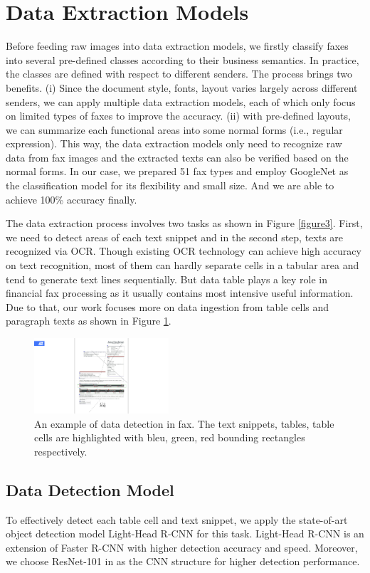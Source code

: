 \documentclass[sigconf]{acmart}
\begin{document}
\section{Data Extraction Models}
Before feeding raw images into data extraction models, we firstly classify faxes into several pre-defined classes according to their business semantics. In practice, the classes are defined with respect to different senders. The process brings two benefits. (i) Since the document style, fonts, layout varies largely across different senders, we can apply multiple data extraction models, each of which only focus on limited types of faxes to improve the accuracy. (ii) with pre-defined layouts, we can summarize each functional areas into some normal forms (i.e., regular expression). This way, the data extraction models only need to recognize raw data from fax images and the extracted texts can also be verified based on the normal forms. In our case, we prepared 51 fax types and employ GoogleNet \cite{szegedy2015going} as the classification model for its flexibility and small size. And we are able to achieve 100\% accuracy finally.

The data extraction process involves two tasks as shown in Figure \ref{figure3}. First, we need to detect areas of each text snippet and in the second step, texts are recognized via OCR. Though existing OCR technology can achieve high accuracy on text recognition, most of them can hardly separate cells in a tabular area and tend to generate text lines sequentially. But data table plays a key role in financial fax processing as it usually contains most intensive useful information. Due to that, our work focuses more on data ingestion from table cells and paragraph texts as shown in Figure \ref{figure5}.


\begin{figure}[h]
	\centering
	\includegraphics[width=5cm]{figure5}
	\caption{An example of data detection in fax. The text snippets, tables, table cells are highlighted with bleu, green, red bounding rectangles respectively. }
	\label{figure5}
\end{figure}

\subsection{Data Detection Model}
To effectively detect each table cell and text snippet, we apply the state-of-art object detection model Light-Head R-CNN \cite{li2017light} for this task. Light-Head R-CNN is an extension of Faster R-CNN with higher detection accuracy and speed. Moreover, we choose ResNet-101 in \cite{he2016deep} as the CNN structure for higher detection performance.
\end{document}
